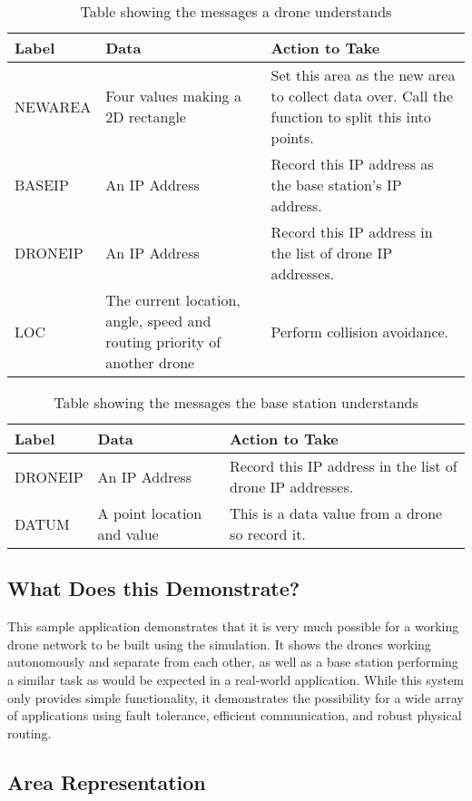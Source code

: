 \begin{table}[]
\centering
\begin{tabular}{|p{2cm}|p{4cm}|p{7.5cm}|}
\hline
Label & Data & Action to Take \\ \hline
NEWAREA	& Four values making a 2D rectangle	& Set this area as the new area to collect data over. Call the function to split this into points. \\ \hline
BASEIP & An IP Address & Record this IP address as the base station's IP address. \\ \hline
DRONEIP	& An IP Address	& Record this IP address in the list of drone IP addresses. \\ \hline
LOC	& The current location, angle, speed and routing priority of another drone & Perform collision avoidance. \\ \hline
\end{tabular}
\caption{Table showing the messages a drone understands}
\label{tbl:messages_drone}
\end{table}

\begin{table}[]
\centering
\begin{tabular}{|p{2cm}|p{4cm}|p{7.5cm}|}
\hline
Label	& Data							& Action to Take	\\ \hline
DRONEIP	& An IP Address					& Record this IP address in the list of drone IP addresses. \\ \hline
DATUM	& A point location and value	& This is a data value from a drone so record it. \\ \hline
\end{tabular}
\caption{Table showing the messages the base station understands}
\label{tbl:messages_basestation}
\end{table}

\subsection{What Does this Demonstrate?}
This sample application demonstrates that it is very much possible for a working drone network to be built using the simulation. It shows the drones working autonomously and separate from each other, as well as a base station performing a similar task as would be expected in a real-world application. While this system only provides simple functionality, it demonstrates the possibility for a wide array of applications using fault tolerance, efficient communication, and robust physical routing.

\subsection{Area Representation}

